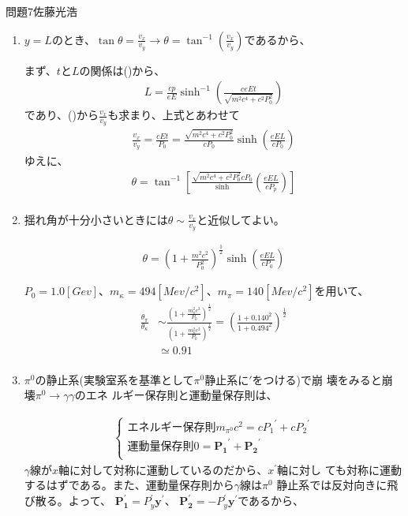 \documentclass[fleqn]{jbook}
\begin{document}
\begin{answer}{問題7}{佐藤光浩}
\begin{enumerate}
    \item
 $y=L$のとき、$\tan\theta = \frac{v_x}{v_y} \rightarrow \theta =
\tan^{-1} \left(\frac{v_x}{v_y}\right)$であるから、

まず、$t$と$L$の関係は()から、
\begin{eqnarray*}
 L = \frac{cp}{eE} \sinh^{-1} \left(\frac{ceEt}{\sqrt{m^2c^4+c^2P_0^2}}\right)
\end{eqnarray*}
であり、()から$\frac{v_x}{v_y}$も求まり、上式とあわせて
\begin{eqnarray*}
  \frac{v_x}{v_y} = \frac{cEt}{P_0} 
  = \frac{\sqrt{m^2c^4 + c^2P_0^2}}{cP_0}\sinh
  \left(\frac{eEL}{cP_0}\right) 
\end{eqnarray*}
ゆえに、
\begin{eqnarray}
 \theta = \tan^{-1}
 \left[\frac{\sqrt{m^2c^4+c^2P_0^2}{cP_0}}\sinh(\frac{eEL}{cP_p})\right]
 \\
\end{eqnarray}

    \item
 揺れ角が十分小さいときには$\theta \sim \frac{v_x}{v_y}$と近似してよい。

\begin{eqnarray*}
 \theta = \left(1+\frac{m^2c^2}{P_0^2}\right)^{\frac{1}{2}}
 \sinh\left(\frac{eEL}{cP_0}\right)
\end{eqnarray*}

$P_0=1.0[Gev]$、$m_{\kappa}=494[Mev/c^2]$、$m_{\pi}=140[Mev/c^2]$を用いて、
\begin{eqnarray}
  \frac{\theta_{\pi}}{\theta_{\kappa}} &\sim
  \frac{\left(1+\frac{m_{\pi}^2c^2}{P_0}\right)^{\frac{1}{2}}}{\left(1+\frac{m_{\kappa}^2c^2}{P_0}\right)^{\frac{1}{2}}} 
  = \left(\frac{1+0.140^2}{1+0.494^2}\right)^{\frac{1}{2}} \\
 &\simeq 0.91 \\
\end{eqnarray}

    \item
$\pi^0$の静止系(実験室系を基準として$\pi^0$静止系に$\prime$をつける)で崩
壊をみると崩壊$\pi^0 \rightarrow \gamma\gamma$のエネ
ルギー保存則と運動量保存則は、

\begin{eqnarray}
 \begin{cases}
  \text{エネルギー保存則} m_{\pi^0}c^2 = c{P_1}^{\prime} + c{P_2}^{\prime}
  \\
  \text{運動量保存則}　0 = \mathbf{P_1}^{\prime} + \mathbf{P_2}^{\prime}
  \\
 \end{cases}
\end{eqnarray}
$\gamma$線が$x$軸に対して対称に運動しているのだから、$x^{\prime}$軸に対し
ても対称に運動するはずである。また、運動量保存則から$\gamma$線は$\pi^0$
静止系では反対向きに飛び散る。よって、
$\mathbf{P_1^{\prime}}=P_y^{\prime}\mathbf{y^{\prime}}$、
$\mathbf{P_2^{\prime}}=-P_y^{\prime}\mathbf{y^{\prime}}$であるから、


\end{enumerate}
\end{answer}
\end{document}
